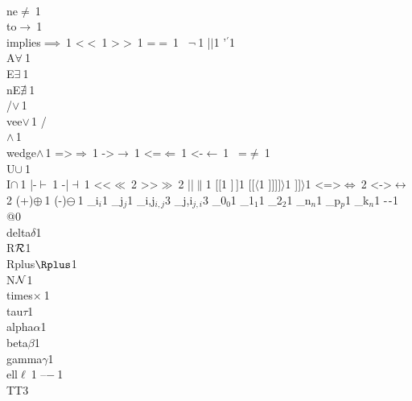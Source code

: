 {        {\\ne}{{$\ne\ $}}1
        {\\to}{{$\to\ $}}1
        {\\implies}{{$\implies\ $}}1
        {<}{{$<\ $}}1
        {>}{{$>\ $}}1
        {=}{{$=\ $}}1
        {~}{{$\neg\ $}}1
        {|}{{$\mid$}}1
        {'}{{$^\prime$}}1
        {\\A}{{$\forall\ $}}1
        {\\E}{{$\exists\ $}}1
        {\\nE}{{$\nexists\ $}}1
        {\\/}{{$\vee\,$}}1
        {\\vee}{{$\vee\,$}}1
        {/\\}{{$\wedge\,$}}1
        {\\wedge}{{$\wedge\,$}}1
        {=>}{{$\Rightarrow\ $}}1
        {->}{{$\rightarrow\ $}}1
        {<=}{{$\Leftarrow\ $}}1
        {<-}{{$\leftarrow\ $}}1
        {~=}{{$\neq\ $}}1
        {\\U}{{$\cup\ $}}1
        {\\I}{{$\cap\ $}}1
        {|-}{{$\vdash\ $}}1
        {-|}{{$\dashv\ $}}1
        {<<}{{$\ll\ $}}2
        {>>}{{$\gg\ $}}2
        {||}{{$\|$}}1
        {[}{{$[$}}1
        {]}{{$\,]$}}1
        {[[}{{$\langle$}}1
        {]]]}{{$]\rangle$}}1
        {]]}{{$\rangle$}}1
        {<=>}{{$\Leftrightarrow\ $}}2
        {<->}{{$\leftrightarrow\ $}}2
        {(+)}{{$\oplus\ $}}1
        {(-)}{{$\ominus\ $}}1
        {_i}{{$_{i}$}}1
        {_j}{{$_{j}$}}1
        {_{i,j}}{{$_{i,j}$}}3
        {_{j,i}}{{$_{j,i}$}}3
        {_0}{{$_0$}}1
        {_1}{{$_1$}}1
        {_2}{{$_2$}}1
        {_n}{{$_n$}}1
        {_p}{{$_p$}}1
        {_k}{{$_n$}}1
        {-}{{$\ms{-}$}}1
        {@}{{}}0
        {\\delta}{{$\delta$}}1
        {\\R}{{${\mathcal R}$}}1
        {\\Rplus}{{$\Rplus$}}1
        {\\N}{{${\mathcal N}$}}1
        {\\times}{{$\times\ $}}1
        {\\tau}{{$\tau$}}1
        {\\alpha}{{$\alpha$}}1
        {\\beta}{{$\beta$}}1
        {\\gamma}{{$\gamma$}}1
        {\\ell}{{$\ell\ $}}1
        {--}{{$-\ $}}1
        {\\TT}{{\hspace{1.5em}}}3
      }

